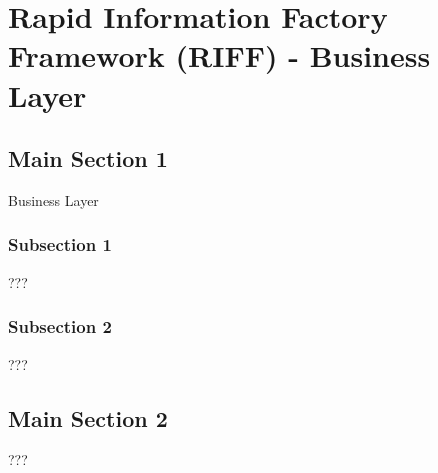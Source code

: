 
\chapter{Rapid Information Factory Framework (RIFF) - Business Layer} %

\label{Chapter34} %



\section{Main Section 1}

Business Layer

\subsection{Subsection 1}

???


\subsection{Subsection 2}

???


\section{Main Section 2}

???
